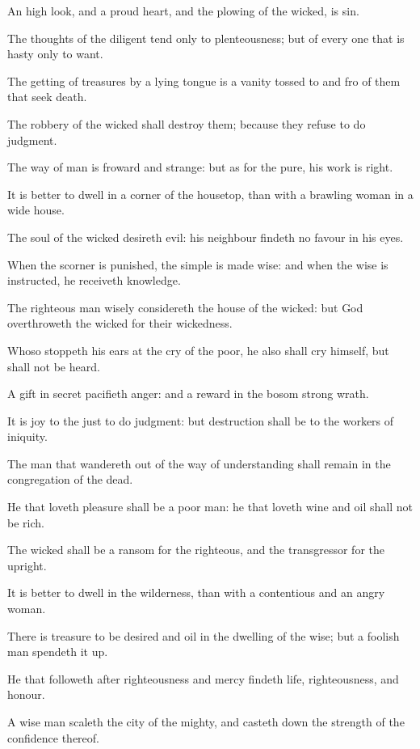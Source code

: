 \Verse An high look, and a proud heart, and the plowing of the wicked, is sin.

\Verse The thoughts of the diligent tend only to plenteousness; but of every one that is hasty only to want.

\Verse The getting of treasures by a lying tongue is a vanity tossed to and fro of them that seek death.

\Verse The robbery of the wicked shall destroy them; because they refuse to do judgment.

\Verse The way of man is froward and strange: but as for the pure, his work is right.

\Verse It is better to dwell in a corner of the housetop, than with a brawling woman in a wide house.

\Verse The soul of the wicked desireth evil: his neighbour findeth no favour in his eyes.

\Verse When the scorner is punished, the simple is made wise: and when the wise is instructed, he receiveth knowledge.

\Verse The righteous man wisely considereth the house of the wicked: but God overthroweth the wicked for their wickedness.

\Verse Whoso stoppeth his ears at the cry of the poor, he also shall cry himself, but shall not be heard.

\Verse A gift in secret pacifieth anger: and a reward in the bosom strong wrath.

\Verse It is joy to the just to do judgment: but destruction shall be to the workers of iniquity.

\Verse The man that wandereth out of the way of understanding shall remain in the congregation of the dead.

\Verse He that loveth pleasure shall be a poor man: he that loveth wine and oil shall not be rich.

\Verse The wicked shall be a ransom for the righteous, and the transgressor for the upright.

\Verse It is better to dwell in the wilderness, than with a contentious and an angry woman.

\Verse There is treasure to be desired and oil in the dwelling of the wise; but a foolish man spendeth it up.

\Verse He that followeth after righteousness and mercy findeth life, righteousness, and honour.

\Verse A wise man scaleth the city of the mighty, and casteth down the strength of the confidence thereof.

